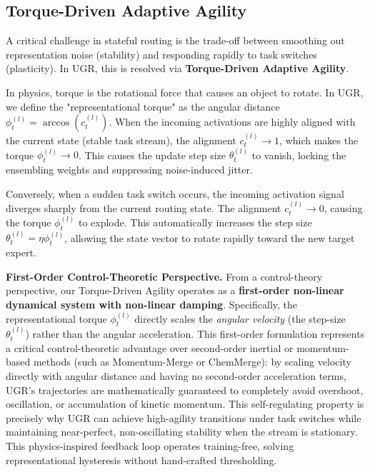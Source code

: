 \subsection{Torque-Driven Adaptive Agility}
A critical challenge in stateful routing is the trade-off between smoothing out representation noise (stability) and responding rapidly to task switches (plasticity). In UGR, this is resolved via \textbf{Torque-Driven Adaptive Agility}. 

In physics, torque is the rotational force that causes an object to rotate. In UGR, we define the "representational torque" as the angular distance $\phi_t^{(l)} = \arccos(c_t^{(l)})$. When the incoming activations are highly aligned with the current state (stable task stream), the alignment $c_t^{(l)} \to 1$, which makes the torque $\phi_t^{(l)} \to 0$. This causes the update step size $\theta_t^{(l)}$ to vanish, locking the ensembling weights and suppressing noise-induced jitter.

Conversely, when a sudden task switch occurs, the incoming activation signal diverges sharply from the current routing state. The alignment $c_t^{(l)} \to 0$, causing the torque $\phi_t^{(l)}$ to explode. This automatically increases the step size $\theta_t^{(l)} = \eta \phi_t^{(l)}$, allowing the state vector to rotate rapidly toward the new target expert. 

\textbf{First-Order Control-Theoretic Perspective.} From a control-theory perspective, our Torque-Driven Agility operates as a \textbf{first-order non-linear dynamical system with non-linear damping}. Specifically, the representational torque $\phi_t^{(l)}$ directly scales the \emph{angular velocity} (the step-size $\theta_t^{(l)}$) rather than the angular acceleration. This first-order formulation represents a critical control-theoretic advantage over second-order inertial or momentum-based methods (such as Momentum-Merge or ChemMerge): by scaling velocity directly with angular distance and having no second-order acceleration terms, UGR's trajectories are mathematically guaranteed to completely avoid overshoot, oscillation, or accumulation of kinetic momentum. This self-regulating property is precisely why UGR can achieve high-agility transitions under task switches while maintaining near-perfect, non-oscillating stability when the stream is stationary. This physics-inspired feedback loop operates training-free, solving representational hysteresis without hand-crafted thresholding.

